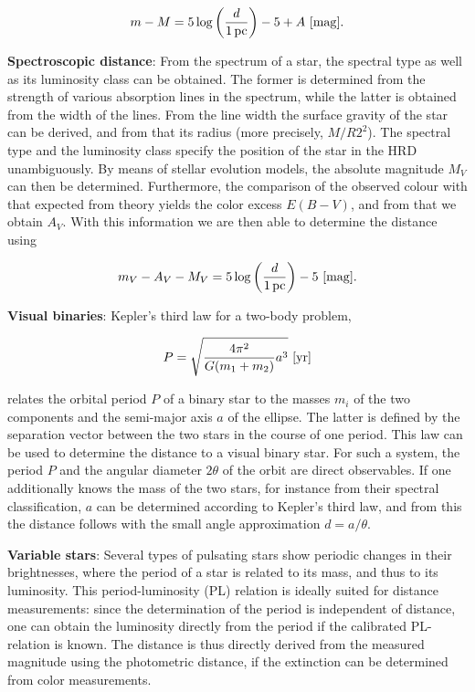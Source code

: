 \documentclass[a4paper,11pt]{article}
\begin{document}
\begin{align*}
    m-M = 5\log\left(\frac{d}{1\,{\rm pc}}\right)-5+A ~ [{\rm mag}].
\end{align*}

{\noindent}\textbf{Spectroscopic distance}: From the spectrum of a star, the spectral type as well as its luminosity class can be obtained. The former is determined from the strength of various absorption lines in the spectrum, while the latter is obtained from the width of the lines. From the line width the surface gravity of the star can be derived, and from that its radius (more precisely, $M/R2^2$). The spectral type and the luminosity class specify the position of the star in the HRD unambiguously. By means of stellar evolution models, the absolute magnitude $M_V$ can then be determined. Furthermore, the comparison of the observed colour with that expected from theory yields the color excess $E(B-V)$, and from that we obtain $A_V$. With this information we are then able to determine the distance using

\begin{align*}
    m_V-A_V-M_V = 5\log\left(\frac{d}{1\,{\rm pc}}\right)-5 ~ [{\rm mag}].
\end{align*}

{\noindent}\textbf{Visual binaries}: Kepler’s third law for a two-body problem,

\begin{align*}
    P = \sqrt{\frac{4\pi^2}{G(m_1+m_2)}a^3} ~ [{\rm yr}]
\end{align*}

{\noindent}relates the orbital period $P$ of a binary star to the masses $m_i$ of the two components and the semi-major axis $a$ of the ellipse. The latter is defined by the separation vector between the two stars in the course of one period. This law can be used to determine the distance to a visual binary star. For such a system, the period $P$ and the angular diameter $2\theta$ of the orbit are direct observables. If one additionally knows the mass of the two stars, for instance from their spectral classification, $a$ can be determined according to Kepler's third law, and from this the distance follows with the small angle approximation $d=a/\theta$.

{\noindent}\textbf{Variable stars}: Several types of pulsating stars show periodic changes in their brightnesses, where the period of a star is related to its mass, and thus to its luminosity. This period-luminosity (PL) relation is ideally suited for distance measurements: since the determination of the period is independent of distance, one can obtain the luminosity directly from the period if the calibrated PL-relation is known. The distance is thus directly derived from the measured magnitude using the photometric distance, if the extinction can be determined from color measurements.
\end{document}
